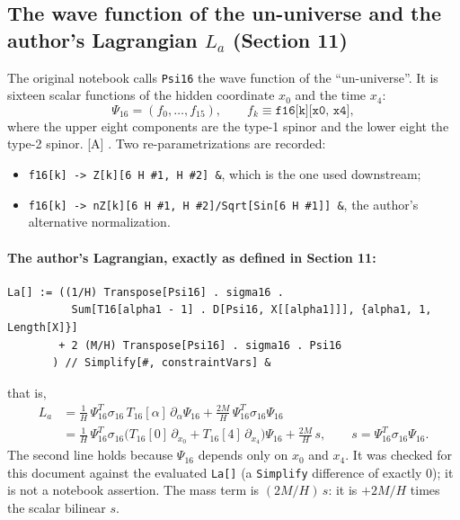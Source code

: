 \subsection{The wave function of the un-universe and the author's Lagrangian \texorpdfstring{$L_a$}{La} (Section 11)}
\label{fnd:La}\label{sec:2.7}

The original notebook calls \texttt{Psi16} the wave function of the ``un-universe''. It is
sixteen scalar functions of the hidden coordinate $x_0$ and the time $x_4$:
\begin{equation}
  \Psi_{16} = (f_0,\dots,f_{15}),\qquad f_k \equiv \texttt{f16[k][x0, x4]},
\end{equation}
where the upper eight components are the type-1 spinor and the lower eight the type-2 spinor.
[A] . Two re-parametrizations
are recorded:
\begin{itemize}
  \item \texttt{f16[k] -> Z[k][6 H \#1, H \#2] \&}, which is the one used downstream;
  \item \texttt{f16[k] -> nZ[k][6 H \#1, H \#2]/Sqrt[Sin[6 H \#1]] \&}, the author's alternative
        normalization.
\end{itemize}

\paragraph{The author's Lagrangian, exactly as defined in Section 11:}
\begin{footnotesize}
\begin{verbatim}
La[] := ((1/H) Transpose[Psi16] . sigma16 .
          Sum[T16[alpha1 - 1] . D[Psi16, X[[alpha1]]], {alpha1, 1, Length[X]}]
        + 2 (M/H) Transpose[Psi16] . sigma16 . Psi16
       ) // Simplify[#, constraintVars] &
\end{verbatim}
\end{footnotesize}
that is,
\begin{align}
  L_a &= \frac1H\,\Psi_{16}^{T}\sigma_{16}\,T_{16}[\alpha]\,\partial_\alpha\Psi_{16}
        + \frac{2M}{H}\,\Psi_{16}^{T}\sigma_{16}\Psi_{16} \\
      &= \frac1H\,\Psi_{16}^{T}\sigma_{16}\bigl(T_{16}[0]\,\partial_{x_0}+T_{16}[4]\,\partial_{x_4}\bigr)\Psi_{16}
        + \frac{2M}{H}\,s,\qquad s=\Psi_{16}^{T}\sigma_{16}\Psi_{16}.
\end{align}
The second line holds because $\Psi_{16}$ depends only on $x_0$ and $x_4$. It was checked for
this document against the evaluated \texttt{La[]} (a \texttt{Simplify} difference of exactly 0);
it is not a notebook assertion. The mass term is $(2M/H)\,s$: it is $+2M/H$ times the scalar
bilinear $s$.

